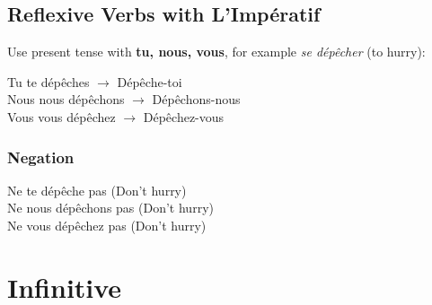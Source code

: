 \documentclass{book}
\begin{document}
\section{Reflexive Verbs with L'Impératif}
Use present tense with \textbf{tu, nous, vous}, for example \textit{se dépêcher} (to hurry):
\begin{center}
    Tu te dépêches $\rightarrow$ Dépêche-toi \\
    Nous nous dépêchons $\rightarrow$ Dépêchons-nous \\
    Vous vous dépêchez $\rightarrow$ Dépêchez-vous
\end{center}

\subsection{Negation}
\begin{center}
    Ne te dépêche pas (Don't hurry) \\
    Ne nous dépêchons pas (Don't hurry) \\
    Ne vous dépêchez pas (Don't hurry)
\end{center}

\chapter{Infinitive}
\end{document}
